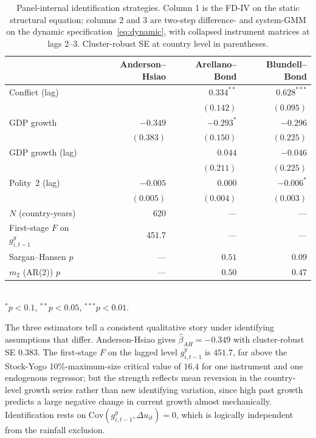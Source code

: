 \documentclass[11pt,a4paper]{article}
\begin{document}
\begin{table}[H]
\centering
\caption{Panel-internal identification strategies. Column 1 is the
\citet{AndersonHsiao1981} FD-IV on the static structural equation;
columns 2 and 3 are two-step difference- and system-GMM on the dynamic
specification~\eqref{eq:dynamic}, with collapsed instrument matrices
at lags 2--3. Cluster-robust SE at country level in parentheses.}
\label{tab:ah}
\small
\begin{tabular}{lrrr}
\toprule
 & Anderson--Hsiao & Arellano--Bond & Blundell--Bond \\
\midrule
Conflict (lag)               &              & $0.334^{**}$  & $0.628^{***}$ \\
                             &              & $(0.142)$     & $(0.095)$     \\
GDP growth                   & $-0.349$     & $-0.293^{*}$  & $-0.296$      \\
                             & $(0.383)$    & $(0.150)$     & $(0.225)$     \\
GDP growth (lag)             &              & $0.044$       & $-0.046$      \\
                             &              & $(0.211)$     & $(0.225)$     \\
Polity~2 (lag)               & $-0.005$     & $0.000$       & $-0.006^{*}$  \\
                             & $(0.005)$    & $(0.004)$     & $(0.003)$     \\
\midrule
$N$ (country-years)          & 620          & ---           & ---           \\
First-stage $F$ on $g^{y}_{i,t-1}$ & 451.7  & ---           & ---           \\
Sargan--Hansen $p$           & ---          & $0.51$        & $0.09$        \\
$m_2$ (AR(2)) $p$            & ---          & $0.50$        & $0.47$        \\
\bottomrule
\end{tabular}\\[2pt]
\footnotesize $^{*}p<0.1$, $^{**}p<0.05$, $^{***}p<0.01$.
\end{table}

The three estimators tell a consistent qualitative story under
identifying assumptions that differ. Anderson-Hsiao gives
$\hat\beta_{AH} = -0.349$ with cluster-robust SE $0.383$. The
first-stage $F$ on the lagged level $g^{y}_{i,t-1}$ is $451.7$, far
above the Stock-Yogo 10\%-maximum-size critical value of $16.4$ for
one instrument and one endogenous regressor; but the strength reflects
mean reversion in the country-level growth series rather than new
identifying variation, since high past growth predicts a large negative
change in current growth almost mechanically. Identification rests on
$\mathrm{Cov}(g^{y}_{i,t-1}, \Delta u_{it}) = 0$, which is logically
independent from the rainfall exclusion.
\end{document}
